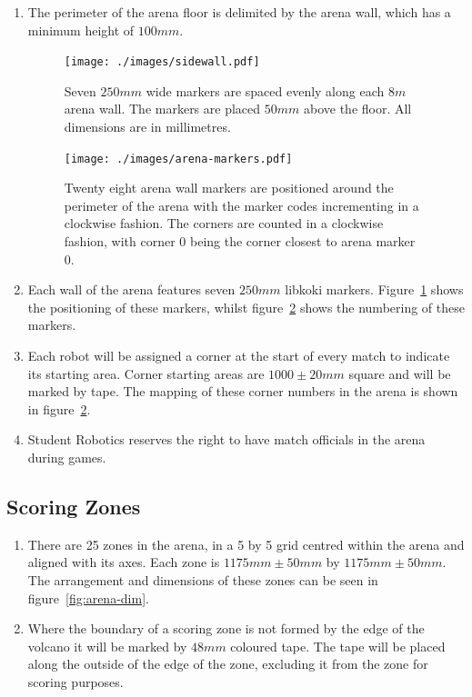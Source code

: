 \begin{enumerate}
\item The perimeter of the arena floor is delimited by the arena wall, which has a minimum height of $100mm$.

\begin{figure}
  \centering
  \texttt{[image: ./images/sidewall.pdf]}
  \caption{Seven $250mm$ wide markers are spaced evenly along each $8m$ arena wall.
           The markers are placed $50mm$ above the floor.
           All dimensions are in millimetres.}
  \label{fig:arena-wall}
\end{figure}

\begin{figure}
  \centering
  \texttt{[image: ./images/arena-markers.pdf]}
  \caption{Twenty eight arena wall markers are positioned around the perimeter of the arena with the marker codes incrementing in a clockwise fashion.
           The corners are counted in a clockwise fashion, with corner 0 being the corner closest to arena marker 0.}
  \label{fig:arena-zones}
\end{figure}

\item Each wall of the arena features seven $250mm$ libkoki markers.
      Figure~\ref{fig:arena-wall} shows the positioning of these markers, whilst figure~\ref{fig:arena-zones} shows the numbering of these markers.

\item Each robot will be assigned a corner at the start of every match to indicate its starting area.
      Corner starting areas are $1000 \pm 20mm$ square and will be marked by tape.
      The mapping of these corner numbers in the arena is shown in figure~\ref{fig:arena-zones}.

\item Student Robotics reserves the right to have match officials in the arena during games.

\end{enumerate}


\subsection{Scoring Zones}
\label{sub:Zones}

\begin{enumerate}
\item There are 25 zones in the arena, in a 5 by 5 grid centred within the arena and aligned with its axes. Each zone is $1175mm \pm 50mm$ by $1175mm \pm 50mm$.
      The arrangement and dimensions of these zones can be seen in figure~\ref{fig:arena-dim}.

\item Where the boundary of a scoring zone is not formed by the edge of the volcano it will be marked by $48mm$ coloured tape.
      The tape will be placed along the outside of the edge of the zone, excluding it from the zone for scoring purposes.
\end{enumerate}

